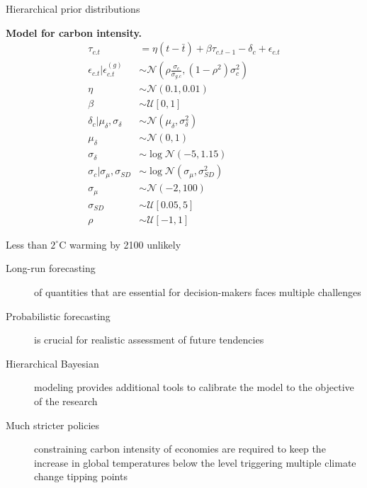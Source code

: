 \documentclass[notes,blackandwhite,mathsans,usenames,dvipsnames]{beamer}
\begin{document}
\begin{frame}{Hierarchical prior distributions}

\bigskip\textbf{Model for carbon intensity.}\small
\begin{align*}
\tau_{c.t} &= \eta (t-\bar{t}) + \beta \tau_{c.t-1} - \delta_{c} + \epsilon_{c.t}\\
\epsilon_{c.t}|\epsilon_{c.t}^{(g)} &\sim\mathcal{N}\left( \rho\frac{\sigma_{c}}{\sigma_{g.c}},(1-\rho^2)\sigma_{c}^2 \right)\\[2ex]
\eta&\sim \mathcal{N}\left( 0.1,0.01 \right)\\
\beta&\sim \mathcal{U}[0,1]\\[1ex]
\delta_c|\mu_\delta,\sigma_\delta&\sim\mathcal{N}\left(\mu_\delta,\sigma_\delta^2\right) \\
\mu_\delta&\sim\mathcal{N}(0,1) \\
\sigma_\delta &\sim\log\mathcal{N}(-5,1.15) \\[1ex]
\sigma_{c}|\sigma_\mu,\sigma_{SD} &\sim\log\mathcal{N}\left(\sigma_\mu,\sigma_{SD}^2\right)\\
\sigma_\mu &\sim\mathcal{N}\left( -2,100 \right)\\
\sigma_{SD} & \sim \mathcal{U}[0.05,5]\\[1ex]
\rho&\sim\mathcal{U}[-1,1]
\end{align*}

\end{frame}













{
\begin{frame}{\color{yel}Less than $2^{\circ}$C warming by 2100 unlikely}

\begin{description}
\item[Long-run forecasting] {\color{yel}of quantities that are essential for decision-makers faces multiple challenges} 

\bigskip\item[Probabilistic forecasting] {\color{yel}is crucial for realistic assessment of future tendencies } 

\bigskip\item[Hierarchical Bayesian] {\color{yel} modeling provides additional tools to calibrate the model to the objective of the research} 

\bigskip\item[Much stricter policies] {\color{yel}constraining carbon intensity of economies are required to keep the increase in global temperatures below the level triggering multiple climate change tipping points}

\end{description}

\end{frame}}
\end{document}
